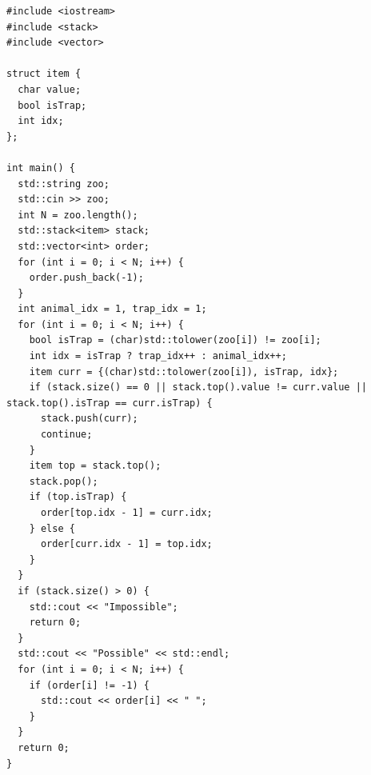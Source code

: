 \begin{lstlisting}
#include <iostream>
#include <stack>
#include <vector>

struct item {
  char value;
  bool isTrap;
  int idx;
};

int main() {
  std::string zoo;
  std::cin >> zoo;
  int N = zoo.length();
  std::stack<item> stack;
  std::vector<int> order;
  for (int i = 0; i < N; i++) {
    order.push_back(-1);
  }
  int animal_idx = 1, trap_idx = 1;
  for (int i = 0; i < N; i++) {
    bool isTrap = (char)std::tolower(zoo[i]) != zoo[i];
    int idx = isTrap ? trap_idx++ : animal_idx++;
    item curr = {(char)std::tolower(zoo[i]), isTrap, idx};
    if (stack.size() == 0 || stack.top().value != curr.value || stack.top().isTrap == curr.isTrap) {
      stack.push(curr);
      continue;
    }
    item top = stack.top();
    stack.pop();
    if (top.isTrap) {
      order[top.idx - 1] = curr.idx;
    } else {
      order[curr.idx - 1] = top.idx;
    }
  }
  if (stack.size() > 0) {
    std::cout << "Impossible";
    return 0;
  }
  std::cout << "Possible" << std::endl;
  for (int i = 0; i < N; i++) {
    if (order[i] != -1) {
      std::cout << order[i] << " ";
    }
  }
  return 0;
}
\end{lstlisting}
